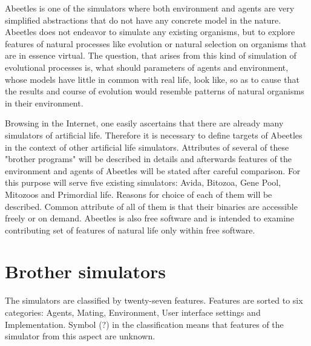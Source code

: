 \documentclass[a4paper,12pt]{report}
\begin{document}
Abeetles is one of the simulators where both environment and agents are very simplified abstractions that do not have any concrete model in the nature. Abeetles does not endeavor to simulate any existing organisms, but to explore features of natural processes like evolution or natural selection on organisms that are in essence virtual. The question, that arises from this kind of simulation of evolutional processes is, what should parameters of agents and environment, whose models have little in common with real life, look like, so as to cause that the results and course of evolution would resemble patterns of natural organisms in their environment.  


Browsing in the Internet, one easily ascertains that there are already many simulators of artificial life. Therefore it is necessary to define targets of Abeetles in the context of other artificial life simulators. Attributes of several of these "brother programs" will be described in details and afterwards features of the environment and agents of Abeetles will be stated after careful comparison. For this purpose will serve five existing simulators: Avida, Bitozoa, Gene Pool, Mitozoos and Primordial life. Reasons for choice of each of them will be described. Common attribute of all of them is that their binaries are accessible freely or on demand. Abeetles is also free software and is intended to examine contributing set of features of natural life only within free software.

\section{Brother simulators}


The simulators are classified by twenty-seven features. Features are sorted to   
six categories: Agents, Mating, Environment, User interface settings and Implementation. Symbol (?) in the classification means that features of the simulator from this aspect are unknown.
\end{document}
